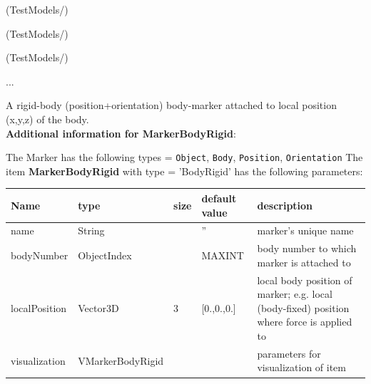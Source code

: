 \item {} (TestModels/)
\item {} (TestModels/)
\item {} (TestModels/)
\item  ...

\ei

%
\newpage

\label{sec:item:MarkerBodyRigid}
A rigid-body (position+orientation) body-marker attached to local position (x,y,z) of the body.\vspace{12pt}
 \\{\bf Additional information for MarkerBodyRigid}:
\bi
  \item The Marker has the following types = \texttt{Object}, \texttt{Body}, \texttt{Position}, \texttt{Orientation}
\ei
\vspace{12pt} \noindent The item {\bf MarkerBodyRigid} with type = 'BodyRigid' has the following parameters:\vspace{-1cm}\\ 
\begin{center}
  \footnotesize
  \begin{longtable}{| p{4.5cm} | p{2.5cm} | p{0.5cm} | p{2.5cm} | p{6cm} |}
    \hline
    \bf Name & \bf type & \bf size & \bf default value & \bf description \\ \hline
    name &     String &      &     '' &     marker's unique name\\ \hline
    bodyNumber &     ObjectIndex &      &     MAXINT &     body number to which marker is attached to\\ \hline
    localPosition &     Vector3D &     3 &     [0.,0.,0.] &     local body position of marker; e.g. local (body-fixed) position where force is applied to\\ \hline
    visualization & VMarkerBodyRigid & & & parameters for visualization of item \\ \hline
	  \end{longtable}
	\end{center}
